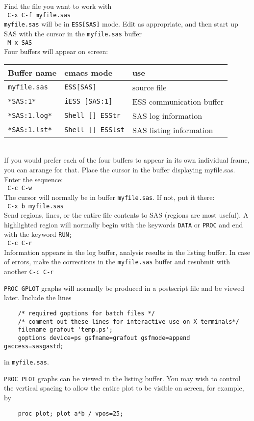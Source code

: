 \documentclass{article}
\newcommand{\elcode}[1]{\\{\texttt{\hspace*{2em} #1}}\\}
\begin{document}
Find the file you want to work with
    \elcode{C-x C-f myfile.sas}
\texttt{myfile.sas} will be in \texttt{ESS[SAS]} mode.
Edit as appropriate, and then start up SAS with the cursor in
the \texttt{myfile.sas} buffer
    \elcode{M-x SAS}
Four buffers will appear on screen:\\
\begin{tabular}{lll}  \hline
  Buffer name     & emacs mode         & use\\  \hline
  \texttt{myfile.sas}  & \texttt{ESS[SAS]}       &source file   \\
  \texttt{*SAS:1*}     & \texttt{iESS [SAS:1]}   &ESS communication buffer \\
  \texttt{*SAS:1.log*} & \texttt{Shell [] ESStr} &SAS log information      \\
  \texttt{*SAS:1.lst*} & \texttt{Shell [] ESSlst}&SAS listing information  \\
  \hline
\end{tabular}\\[1ex]
If you would prefer each of the four buffers to appear in its own
individual frame, you can arrange for that.  Place the cursor in the
buffer displaying myfile.sas.  Enter the sequence:
    \elcode{C-c C-w}
The cursor will normally be in buffer \texttt{myfile.sas}.  If
not, put it there:
    \elcode{C-x b myfile.sas}
Send regions, lines, or the entire file contents to SAS
(regions are most useful).  A highlighted region will normally
begin with the keywords \texttt{DATA} or \texttt{PROC} and end with the
keyword \texttt{RUN;}
    \elcode{C-c C-r}
Information appears in the log buffer, analysis results in the
listing buffer.  In case of errors, make the corrections in the
\texttt{myfile.sas} buffer and resubmit with another \texttt{C-c C-r}

\texttt{PROC GPLOT} graphs will normally be produced in a postscript
file and be viewed later.  Include the lines
{\small
\begin{verbatim}
    /* required goptions for batch files */
    /* comment out these lines for interactive use on X-terminals*/
    filename grafout 'temp.ps';
    goptions device=ps gsfname=grafout gsfmode=append gaccess=sasgastd;
\end{verbatim}
}
\noindent
in \texttt{myfile.sas}.

\texttt{PROC PLOT} graphs can be viewed in the listing buffer.  You
may wish to control the vertical spacing to allow the entire plot to
be visible on screen, for example, by
\begin{verbatim}
    proc plot; plot a*b / vpos=25;
\end{verbatim}
 
\end{document}
